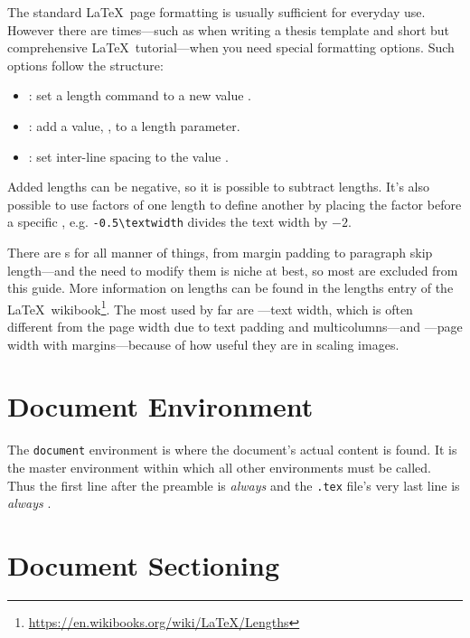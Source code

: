 The standard \LaTeX~page formatting is usually sufficient for everyday
use.  However there are times---such as when writing a thesis template
and short but comprehensive \LaTeX~tutorial---when you need special
formatting options.  Such options follow the structure:
\begin{itemize}
    \item {}: set a length command to a new value .
    \item {}: add a value, , to a length parameter.
    \item {}: set inter-line spacing to the value .
\end{itemize}
Added lengths can be negative, so it is possible to subtract lengths.
It's also possible to use factors of one length to define another by
placing the factor before a specific ,
e.g. \verb|-0.5\textwidth| divides the text width by $-2$.

There are s for all manner of things, from margin
padding to paragraph skip length---and the need to modify them is
niche at best, so most are excluded from this guide.  More information
on lengths can be found in the lengths entry of the
\LaTeX~wikibook\footnote{\url{https://en.wikibooks.org/wiki/LaTeX/Lengths}}.
The most used by far are ---text width, which is
often different from the page width due to text padding and
multicolumns---and ---page width with margins---because
of how useful they are in scaling images.

%
\section{Document Environment}
%
%

The \verb|document| environment is where the document's actual content
is found.  It is the master environment within which all other
environments must be called.  Thus the first line after the preamble
is \emph{always}  and the \texttt{.tex} file's
very last line is \emph{always} .

\section{Document Sectioning}
%


